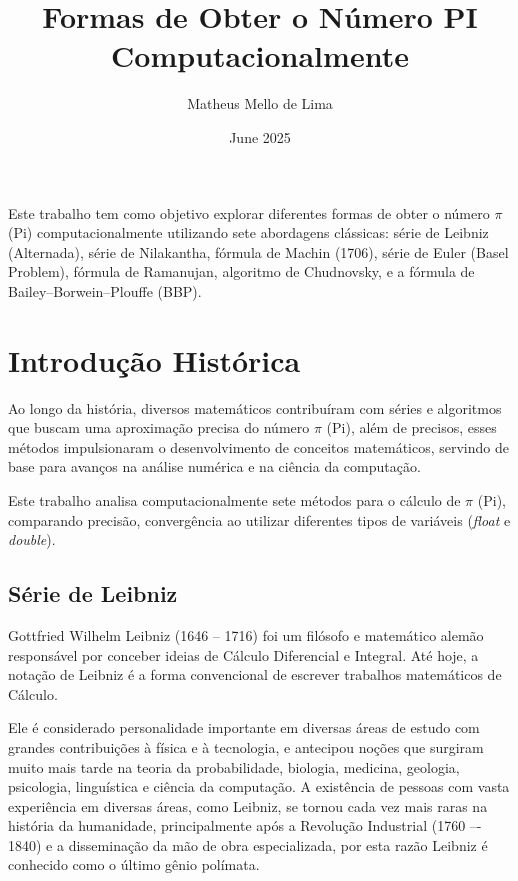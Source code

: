\documentclass[12pt]{article}
\title{Formas de Obter o Número PI Computacionalmente}
\author{Matheus Mello de Lima}
\date{June 2025}
\begin{document}
\maketitle

\begin{resumo} 
  Este trabalho tem como objetivo explorar diferentes formas de obter o número  \begin{math}\pi\end{math} (Pi) computacionalmente utilizando sete abordagens clássicas: série de Leibniz (Alternada), série de Nilakantha, fórmula de Machin (1706), série de Euler (Basel Problem), fórmula de Ramanujan, algoritmo de Chudnovsky, e a fórmula de Bailey–Borwein–Plouffe (BBP).
\end{resumo}

\section{Introdução Histórica}

Ao longo da história, diversos matemáticos contribuíram com séries e algoritmos que buscam uma aproximação precisa do número \begin{math}\pi\end{math} (Pi), além de precisos, esses métodos impulsionaram o desenvolvimento de conceitos matemáticos, servindo de base para avanços na análise numérica e na ciência da computação.

Este trabalho analisa computacionalmente sete métodos para o cálculo de \begin{math}\pi\end{math} (Pi), comparando precisão, convergência ao utilizar diferentes tipos de variáveis (\textit{float} e \textit{double}).

\subsection{Série de Leibniz}

Gottfried Wilhelm Leibniz (1646 -- 1716) foi um filósofo e matemático alemão responsável por conceber ideias de Cálculo Diferencial e Integral. Até hoje, a notação de Leibniz é a forma convencional de escrever trabalhos matemáticos de Cálculo.

Ele é considerado personalidade importante em diversas áreas de estudo com grandes contribuições à física e à tecnologia, e antecipou noções que surgiram muito mais tarde na teoria da probabilidade, biologia, medicina, geologia, psicologia, linguística e ciência da computação. A existência de pessoas com vasta experiência em diversas áreas, como Leibniz, se tornou cada vez mais raras na história da humanidade, principalmente após a Revolução Industrial (1760 –- 1840) e a disseminação da mão de obra especializada, por esta razão Leibniz é conhecido como o último gênio polímata.
\end{document}
